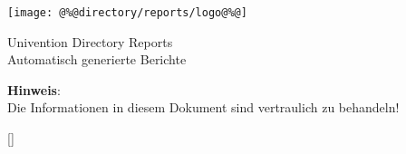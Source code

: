 \documentclass[a4paper,9pt,DIV10]{scrartcl}
\begin{document}
\setlength{\parskip}{1ex plus 0.3ex minus 0.1ex}
\setlength{\oddsidemargin}{0.5cm}
\setlength{\evensidemargin}{0.9cm}

\sffamily

\thispagestyle{empty}
\begin{flushright}
  \texttt{[image: @\%@directory/reports/logo@\%@]}
\end{flushright}
\sffamily \bfseries

\begin{center}
  \vspace {1.0cm}
  \Huge
  Univention Directory Reports\\ [1.5cm]
  \Large
  Automatisch generierte Berichte
  \vspace*{3.0cm}


  \large
  \textbf{Hinweis}:\\
\normalsize
\normalfont
  Die Informationen in diesem Dokument sind vertraulich zu
  behandeln!
\end{center}
\normalsize
\normalfont
\newpage

\pagestyle{scrheadings}
\sffamily
{}
\setfootsepline{0.4pt}[\color{ucsRed}]
\ofoot{\pagemark /\pageref{LastPage}}
\ifoot{}
\cfoot{}

\end{document}
